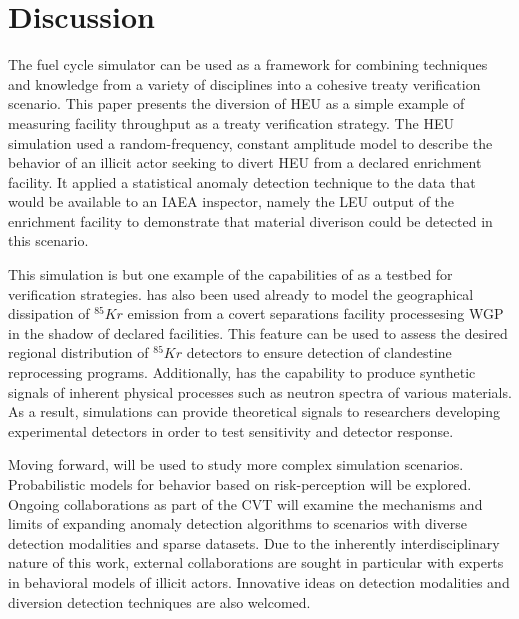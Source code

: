 \section{Discussion}
\label{s_dis}

The \Cyclus fuel cycle simulator can be used as a framework for combining techniques and knowledge from a variety of disciplines into a cohesive treaty verification scenario. This paper presents the diversion of \gls{HEU} as a simple example of measuring facility throughput as a treaty verification strategy.  The \gls{HEU} simulation used a random-frequency, constant amplitude model to describe the behavior of an illicit actor seeking to divert \gls{HEU} from a declared enrichment facility.  It applied a statistical anomaly detection technique to the data that would be available to an \gls{IAEA} inspector, namely the \gls{LEU} output of the enrichment facility to demonstrate that material diverison could be detected in this scenario.

This simulation is but one example of the capabilities of \Cyclus as a testbed for verification strategies.  \Cyclus has also been used already to model the geographical dissipation of $^{85}Kr$ emission from a covert separations facility processesing \gls{WGP} in the shadow of declared facilities.  This feature can be used to assess the desired regional distribution of $^{85}Kr$ detectors to ensure detection of clandestine reprocessing programs.  Additionally, \Cyclus has the capability to produce synthetic signals of inherent physical processes such as neutron spectra of various materials.  As a result, \Cyclus simulations can provide theoretical signals to researchers developing experimental detectors in order to test sensitivity and detector response.

Moving forward, \Cyclus will be used to study more complex simulation scenarios.  Probabilistic models for behavior based on risk-perception will be explored.  Ongoing collaborations as part of the \gls{CVT} will examine the mechanisms and limits of expanding anomaly detection algorithms to scenarios with diverse detection modalities and sparse datasets.  Due to the inherently interdisciplinary nature of this work, external collaborations are sought in particular with experts in behavioral models of illicit actors. Innovative ideas on detection modalities and diversion detection techniques are also welcomed.



\textit{}